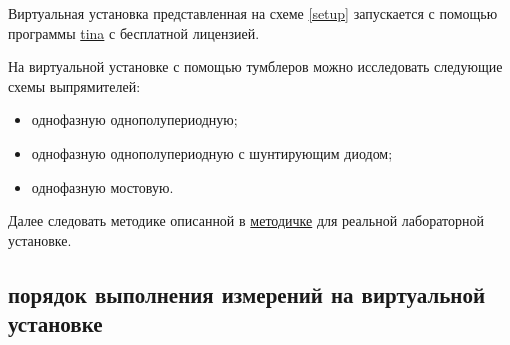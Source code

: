 Виртуальная установка представленная на схеме \ref{setup} запускается с помощью программы \href{http://www.ti.com/tool/TINA-TI}{tina} с бесплатной лицензией.

На виртуальной установке с помощью тумблеров можно исследовать следующие схемы выпрямителей:

\begin{itemize}
\item однофазную однополупериодную;
\item однофазную однополупериодную с шунтирующим диодом;
\item однофазную мостовую.
\end{itemize}

Далее следовать методике описанной в \href{https://github.com/trot-t/power_el_method_old/blob/master/%D0%A1%D0%B8%D0%BB%D0%BE%D0%B2%D0%B0%D1%8F%20%D1%8D%D0%BB%D0%B5%D0%BA%D1%82%D1%80%D0%BE%D0%BD%D0%B8%D0%BA%D0%B0%20%D0%BC%D0%B5%D1%82%D0%BE%D0%B4%D0%B8%D1%87%D0%BA%D0%B0%20%D0%BB%D0%B0%D0%B1%D0%BE%D1%80%D0%B0%D1%82%D0%BE%D1%80%D0%BD%D1%8B%D0%B5.pdf}{методичке} для реальной лабораторной установке.


\subsection{порядок выполнения измерений на виртуальной установке}


